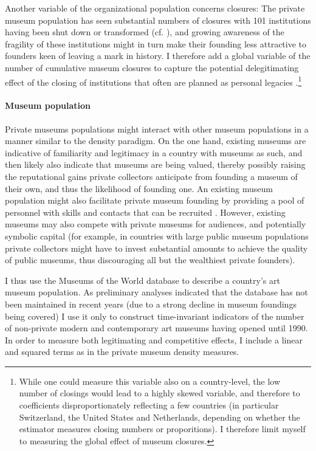 \documentclass[11pt]{article}
\begin{document}
Another variable of the organizational population concerns closures:
The private museum population has seen substantial numbers of closures with 101 institutions having been shut down or transformed (cf. \cite{Velthuis_Gera_forthcoming_fragility}), and growing awareness of the fragility of these institutions might in turn make their founding less attractive to founders keen of leaving a mark in history.
I therefore add a global variable of the number of cumulative museum closures to capture the potential delegitimating effect of the closing of institutions that often are planned as personal legacies \parencite{Walker_2019_collector}.\footnote{While one could measure this variable also on a country-level, the low number of closings would lead to a highly skewed variable, and therefore to coefficients disproportionately reflecting a few countries (in particular Switzerland, the United States and Netherlands, depending on whether the estimator measures closing numbers or proporitions). I therefore limit myself to measuring the global effect of museum closures.} 




\paragraph*{Museum population}


Private museums populations might interact with other museum populations in a manner similar to the density paradigm. 
On the one hand, existing museums are indicative of familiarity and legitimacy in a country with museums as such, and then likely also indicate that museums are being valued, thereby possibly raising the reputational gains private collectors anticipate from founding a museum of their own, and thus the likelihood of founding one.
An existing museum population might also facilitate private museum founding by providing a pool of personnel with skills and contacts that can be recruited \parencite{Quemin_2020_power}.
However, existing museums may also compete with private museums for audiences, and potentially symbolic capital (for example, in countries with large public museum populations private collectors might have to invest substantial amounts to achieve the quality of public museums, thus discouraging all but the wealthiest private founders). 


I thus use the Museums of the World database \parencite{deGruyter_2021_MOW} to describe a country's art museum population. 
As preliminary analyses indicated that the database has not been maintained in recent years (due to a strong decline in museum foundings being covered) I use it only to construct time-invariant indicators of the number of non-private modern and contemporary art museums having opened until 1990.
In order to measure both legitimating and competitive effects, I include a linear and squared terms as in the private museum density measures.
\end{document}
